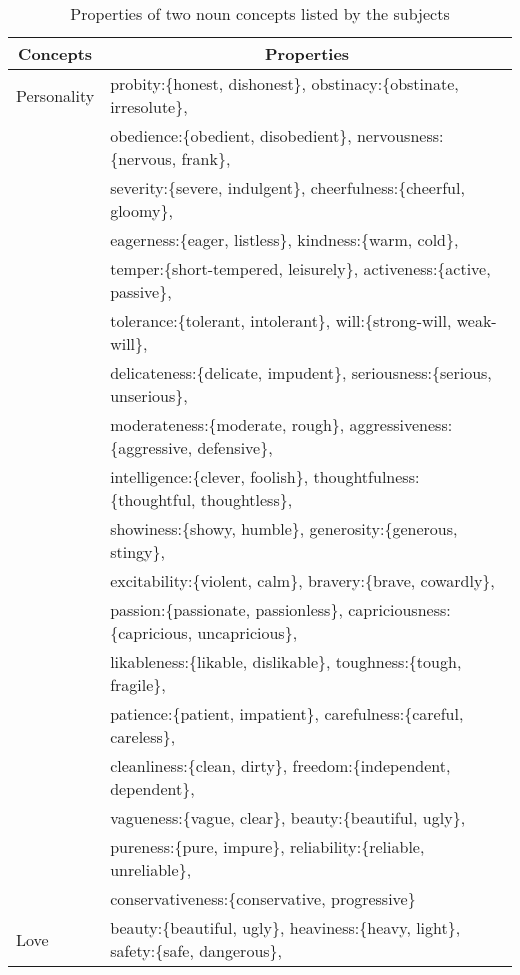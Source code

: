 \begin{table}[t]
  \caption{Properties of two noun concepts listed by the subjects}
  \label{tbl:metaphor-free}
  \footnotesize
  \begin{tabular}{l@{~~~}l} \hline
    \multicolumn{1}{c}{Concepts} & \multicolumn{1}{c}{Properties} \\ \hline 
    Personality &  probity:\{honest, dishonest\}, 
    obstinacy:\{obstinate, irresolute\},\\
    & obedience:\{obedient, disobedient\},
    nervousness:\{nervous, frank\}, \\
    & severity:\{severe, indulgent\}, 
    cheerfulness:\{cheerful, gloomy\},\\
    & eagerness:\{eager, listless\},
    kindness:\{warm, cold\},\\
    & temper:\{short-tempered, leisurely\},
    activeness:\{active, passive\},\\
    & tolerance:\{tolerant, intolerant\},
    will:\{strong-will, weak-will\},\\
    & delicateness:\{delicate, impudent\},
    seriousness:\{serious, unserious\},\\
    & moderateness:\{moderate, rough\},
    aggressiveness:\{aggressive, defensive\},\\
    & intelligence:\{clever, foolish\},
    thoughtfulness:\{thoughtful, thoughtless\},\\
    & showiness:\{showy, humble\},
    generosity:\{generous, stingy\},\\
    & excitability:\{violent, calm\},
    bravery:\{brave, cowardly\},\\
    & passion:\{passionate, passionless\},
    capriciousness:\{capricious, uncapricious\},\\
    & likableness:\{likable, dislikable\},
    toughness:\{tough, fragile\},\\
    & patience:\{patient, impatient\},
    carefulness:\{careful, careless\},\\
    & cleanliness:\{clean, dirty\},
     freedom:\{independent, dependent\},\\
    & vagueness:\{vague, clear\},
    beauty:\{beautiful, ugly\},\\
    & pureness:\{pure, impure\},
    reliability:\{reliable, unreliable\},\\
    & conservativeness:\{conservative, progressive\}\\
    Love & beauty:\{beautiful, ugly\}, heaviness:\{heavy, light\}, safety:\{safe, dangerous\}, \\

\end{tabular}
\end{table}
